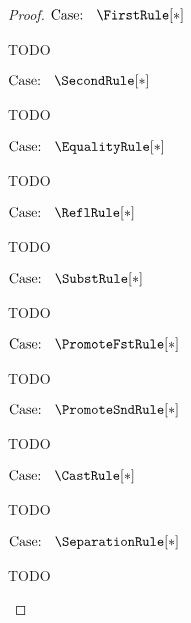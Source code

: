 \begin{proof}
    $\text{Case: }\begin{array}{c} \FirstRule[*] \end{array}$
    \begin{proofcase}
        TODO
    \end{proofcase}

    $\text{Case: }\begin{array}{c} \SecondRule[*] \end{array}$
    \begin{proofcase}
        TODO
    \end{proofcase}

    $\text{Case: }\begin{array}{c} \EqualityRule[*] \end{array}$
    \begin{proofcase}
        TODO
    \end{proofcase}

    $\text{Case: }\begin{array}{c} \ReflRule[*] \end{array}$
    \begin{proofcase}
        TODO
    \end{proofcase}

    $\text{Case: }\begin{array}{c} \SubstRule[*] \end{array}$
    \begin{proofcase}
        TODO
    \end{proofcase}

    $\text{Case: }\begin{array}{c} \PromoteFstRule[*] \end{array}$
    \begin{proofcase}
        TODO
    \end{proofcase}

    $\text{Case: }\begin{array}{c} \PromoteSndRule[*] \end{array}$
    \begin{proofcase}
        TODO
    \end{proofcase}

    $\text{Case: }\begin{array}{c} \CastRule[*] \end{array}$
    \begin{proofcase}
        TODO
    \end{proofcase}

    $\text{Case: }\begin{array}{c} \SeparationRule[*] \end{array}$
    \begin{proofcase}
        TODO
    \end{proofcase}


\end{proof}
